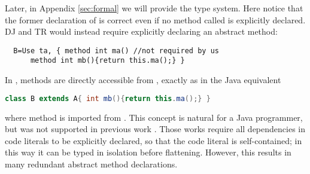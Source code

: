 Later, in Appendix \ref{sec:formal} we will provide the type
system. 
Here notice that the former declaration of \Q@B@ is correct even if
no method called \Q@ma@ is explicitly declared.
DJ and TR would instead require explicitly declaring an abstract \Q@ma@ method:
\saveSpace\saveSpace
\begin{lstlisting}
  B=Use ta, { method int ma() //not required by us
      method int mb(){return this.ma();} }
\end{lstlisting}
\saveSpace\saveSpace
\noindent
In \name, methods are directly accessible from \Q@ta@, exactly as in the Java equivalent
\saveSpace\saveSpace\begin{lstlisting}[language=Java]
  class B extends A{ int mb(){return this.ma();} }  
\end{lstlisting}
\saveSpace\saveSpace
where method \Q@ma@ is imported from \Q@A@.
This concept is natural for a Java programmer, but was not supported
in previous work \cite{BETTINI2013521,deep}. Those works require all
dependencies in code literals to be explicitly declared, so that the
code literal is self-contained;
in this way it can be typed in isolation before flattening.
However, this results in
many redundant abstract method declarations.
\saveSpace\saveSpace\saveSpace\saveSpace
